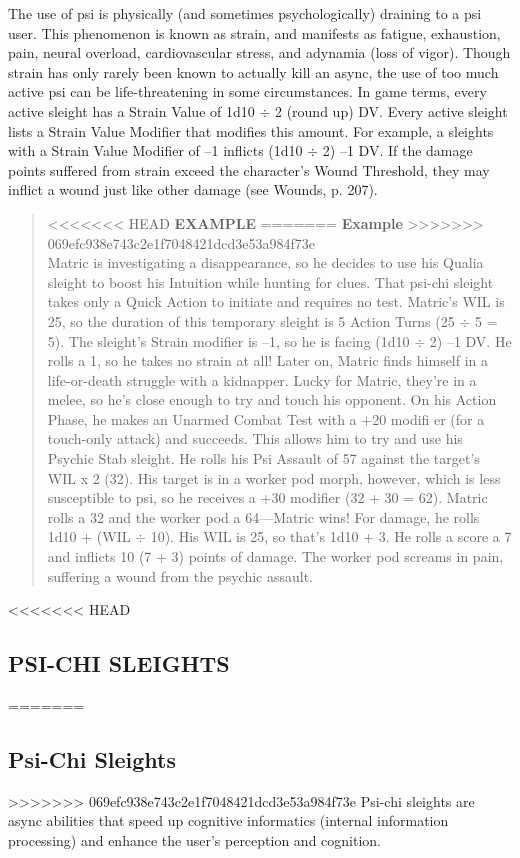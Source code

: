 The use of psi is physically (and sometimes psychologically) draining to a psi user. This phenomenon is known as strain, and manifests as fatigue, exhaustion, pain, neural overload, cardiovascular stress, and adynamia (loss of vigor). Though strain has only rarely been known to actually kill an async, the use of too much active psi can be life-threatening in some circumstances. In game terms, every active sleight has a Strain Value of 1d10 $\div$ 2 (round up) DV. Every active sleight lists a Strain Value Modifier that modifies this amount. For example, a sleights with a Strain Value Modifier of –1 inflicts (1d10 $\div$ 2) –1 DV. If the damage points suffered from strain exceed the character’s Wound Threshold, they may inflict a wound just like other damage (see Wounds, p. 207). 

\begin{quotation} <<<<<<< HEAD \textbf{EXAMPLE} ======= \textbf{Example} >>>>>>> 069efc938e743c2e1f7048421dcd3e53a984f73e \\ Matric is investigating a disappearance, so he decides to use his Qualia sleight to boost his Intuition while hunting for clues. That psi-chi sleight takes only a Quick Action to initiate and requires no test. Matric’s WIL is 25, so the duration of this temporary sleight is 5 Action Turns (25 $\div$ 5 = 5). The sleight’s Strain modifier is –1, so he is facing (1d10 $\div$ 2) –1 DV. He rolls a 1, so he takes no strain at all! Later on, Matric finds himself in a life-or-death struggle with a kidnapper. Lucky for Matric, they’re in a melee, so he’s close enough to try and touch his opponent. On his Action Phase, he makes an Unarmed Combat Test with a +20 modifi er (for a touch-only attack) and succeeds. This allows him to try and use his Psychic Stab sleight. He rolls his Psi Assault of 57 against the target’s WIL x 2 (32). His target is in a worker pod morph, however, which is less susceptible to psi, so he receives a +30 modifier (32 + 30 = 62). Matric rolls a 32 and the worker pod a 64—Matric wins! For damage, he rolls 1d10 + (WIL $\div$ 10). His WIL is 25, so that’s 1d10 + 3. He rolls a score a 7 and inflicts 10 (7 + 3) points of damage. The worker pod screams in pain, suffering a wound from the psychic assault. 

\end{quotation} 





<<<<<<< HEAD \subsection{PSI-CHI SLEIGHTS} ======= \subsection{Psi-Chi Sleights} >>>>>>> 069efc938e743c2e1f7048421dcd3e53a984f73e Psi-chi sleights are async abilities that speed up cognitive informatics (internal information processing) and enhance the user’s perception and cognition. 

